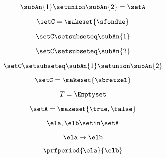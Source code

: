 {\begin{forslides}
        \begin{equation}
            \label{eq:combination-073}
            \subAn{1} \setunion \subAn{2} = \setA
        \end{equation}

        \begin{equation}
            \label{eq:combination-074}
            \setC = \makeset{ \sfondue }
        \end{equation}

        \begin{equation}
            \label{eq:combination-075}
            \setC \setsubseteq \subAn{1}
        \end{equation}

        \begin{equation}
            \label{eq:combination-076}
            \setC \setsubseteq \subAn{2}
        \end{equation}

        \begin{equation}
            \label{eq:combination-077}
            \setC \setsubseteq \subAn{1} \setunion \subAn{2}
        \end{equation}

        \begin{equation}
            \label{eq:combination-078}
            \setC = \makeset{ \sbretzel }
        \end{equation}

        \begin{equation}
            \label{eq:combination-079}
            T = \Emptyset
        \end{equation}

        \begin{equation}
            \label{eq:combination-080}
            \setA = \makeset{ \true, \false }
        \end{equation}

        \begin{equation}
            \label{eq:combination-081}
            \ela, \elb \setin \setA
        \end{equation}

        \begin{equation}
            \label{eq:combination-082}
            \ela \to \elb
        \end{equation}

        \begin{equation}
            \label{eq:combination-083}
            \prfperiod{\ela}{\elb}
        \end{equation}


\end{forslides}}
